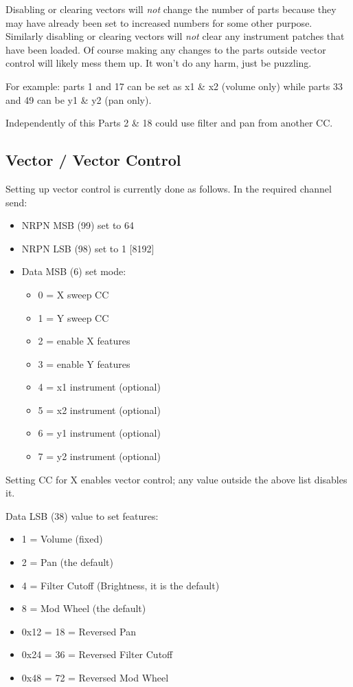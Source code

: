    Disabling or clearing vectors will \textsl{not} change the number of parts
   because they may have already been set to increased numbers for some other
   purpose.  Similarly disabling or clearing vectors will  \textsl{not} clear
   any instrument patches that have been loaded.
   Of course making any changes to the parts outside vector control will likely
   mess them up. It won't do any harm, just be puzzling.

   For example:
   parts 1 and 17 can be set as x1 \& x2 (volume only) while parts 33 and 49
   can be y1 \& y2 (pan only).

   Independently of this Parts 2 \& 18 could use filter and pan from another
   CC.

\subsection{Vector / Vector Control}
\label{subsection:vector_control}

   Setting up vector control is currently done as follows.
   In the required channel send:

   \begin{itemize}
      \item NRPN MSB (99) set to 64
      \item NRPN LSB (98) set to 1 [8192]
      \item Data MSB (6) set mode:
      \begin{itemize}
         \item 0 = X sweep CC
         \item 1 = Y sweep CC
         \item 2 = enable X features
         \item 3 = enable Y features
         \item 4 = x1 instrument (optional)
         \item 5 = x2 instrument (optional)
         \item 6 = y1 instrument (optional)
         \item 7 = y2 instrument (optional)
      \end{itemize}
   \end{itemize}

   Setting CC for X enables vector control; any value outside the above list
   disables it.

   Data LSB (38) value to set features:

   \begin{itemize}
       \item 1 = Volume (fixed)
       \item 2 = Pan (the default)
       \item 4 = Filter Cutoff (Brightness, it is the default)
       \item 8 = Mod Wheel (the default)
       \item 0x12 = 18 = Reversed Pan
       \item 0x24 = 36 = Reversed Filter Cutoff
       \item 0x48 = 72 = Reversed Mod Wheel
   \end{itemize}

